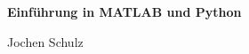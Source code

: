 \usepackage[psamsfonts]{amssymb}
\usepackage{amsmath}
\usepackage[svgnames]{xcolor} %







\begin{center}
\textbf{\LARGE Einf\"uhrung in MATLAB und Python}\\
\end{center}
\begin{minipage}{6cm}
Jochen Schulz
\end{minipage}\hfill
